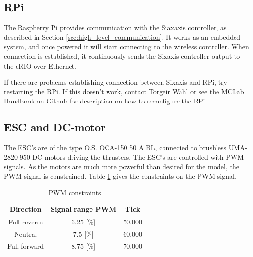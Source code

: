 \subsection{RPi}
The Raspberry Pi provides communication with the Siaxaxis controller, as described in Section \ref{sec:high_level_communication}. It works as an embedded system, and once powered it will start connecting to the wireless controller. When connection is established, it continuously sends the Sixaxis controller output to the cRIO over Ethernet. 

If there are problems establishing connection between Sixaxis and RPi, try restarting the RPi. If this doesn't work, contact Torgeir Wahl or see the MCLab Handbook on Github for description on how to reconfigure the RPi.
\subsection{ESC and DC-motor}
The ESC's are of the type O.S. OCA-150 50 A BL, connected to brushless UMA-2820-950 DC motors driving the thrusters. The ESC's are controlled with PWM signals. As the motors are much more powerful than desired for the model, the PWM signal is constrained. Table \ref{tab:PWM_constraints} gives the constraints on the PWM signal. 
\begin{table}[htb!]
	\centering
	\caption{PWM constraints}
	\begin{tabular}{ccc}
		\hline
		\textbf{Direction} & \textbf{Signal range PWM} & Tick\\ \hline
		Full reverse & 6.25 [\%] & 50.000\\
		Neutral & 7.5 [\%] & 60.000\\
		Full forward & 8.75 [\%] & 70.000\\ \hline
	\end{tabular}
	\label{tab:PWM_constraints}
\end{table}
